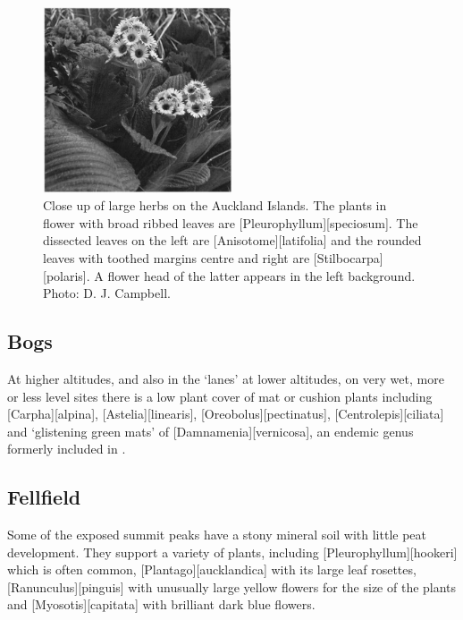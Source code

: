 \begin{figure}
	\includegraphics[width=0.5\textwidth]{graphics/figure117herbs.jpg}
	\centering
	\caption[Close up of large herbs on the Auckland Islands]{Close up of large herbs on the Auckland Islands.
	The plants in flower with broad ribbed leaves are [Pleurophyllum][speciosum].
	The dissected leaves on the left are [Anisotome][latifolia] and the rounded leaves with toothed margins centre and right are [Stilbocarpa][polaris].
	A flower head of the latter appears in the left background.
	Photo: D. J. Campbell.}%
	\label{fig:117herbs}
\end{figure}

\subsection{Bogs}

At higher altitudes, and also in the `lanes' at lower altitudes, on very wet, more or less level sites there is a low plant cover of mat or cushion plants including [Carpha][alpina], [Astelia][linearis], [Oreobolus][pectinatus], [Centrolepis][ciliata] and `glistening green mats' of [Damnamenia][vernicosa], an endemic genus formerly included in .

\subsection{Fellfield}

Some of the exposed summit peaks have a stony mineral soil with little peat development.
They support a variety of plants, including [Pleurophyllum][hookeri] which is often common, [Plantago][aucklandica] with its large leaf rosettes, [Ranunculus][pinguis] with unusually large yellow flowers for the size of the plants and [Myosotis][capitata] with brilliant dark blue flowers.

